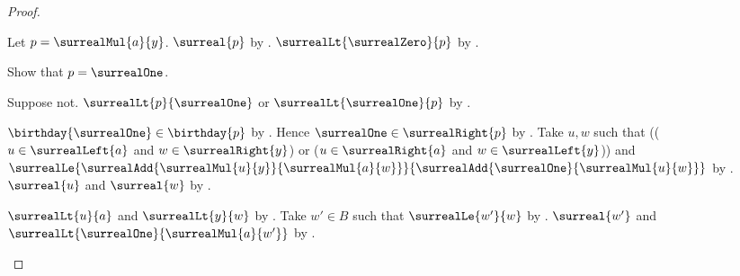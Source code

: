 \begin{proof}
\begin{subproof}
\begin{subproof}
            Let $p=\surrealMul{a}{y}$.
            $\surreal{p}$ by .
            $\surrealLt{\surrealZero}{p}$
                by .

            Show that $p=\surrealOne$.
            \begin{subproof}
                Suppose not.
                $\surrealLt{p}{\surrealOne}$ or
                    $\surrealLt{\surrealOne}{p}$
                    by .
                \begin{byCase}
                        $\birthday{\surrealOne}\in\birthday{p}$
                            by .
                        Hence $\surrealOne\in\surrealRight{p}$
                            by .
                        Take $u,w$ such that
                            (($u\in\surrealLeft{a}$ and
                                $w\in\surrealRight{y}$) or
                             ($u\in\surrealRight{a}$ and
                                $w\in\surrealLeft{y}$)) and
                            $\surrealLe{
                                \surrealAdd{\surrealMul{u}{y}}{
                                    \surrealMul{a}{w}}}{
                                \surrealAdd{\surrealOne}{
                                    \surrealMul{u}{w}}}$
                            by .
                        $\surreal{u}$ and $\surreal{w}$
                            by .
                        \begin{byCase}
                                $\surrealLt{u}{a}$ and
                                    $\surrealLt{y}{w}$
                                    by .
                                Take $w'\in B$ such that
                                    $\surrealLe{w'}{w}$
                                    by .
                                $\surreal{w'}$ and
                                    $\surrealLt{\surrealOne}{
                                        \surrealMul{a}{w'}}$
                                    by .
                                \begin{byCase}

\end{byCase}
\end{byCase}
\end{byCase}
\end{subproof}
\end{subproof}
\end{subproof}
\end{proof}
